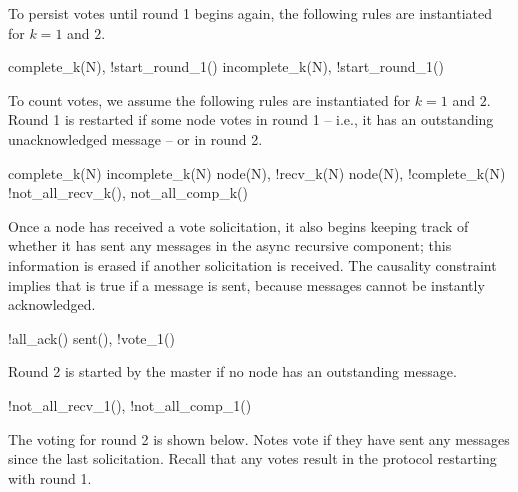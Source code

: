 To persist votes until round 1 begins again, the following rules are instantiated for $k=1$ and $2$.

\begin{Drules}
      {complete_k(N), !start_round_1()}
      {incomplete_k(N), !start_round_1()}
\end{Drules}

To count votes, we assume the following rules are instantiated for $k=1$ and $2$.  Round 1 is restarted if some node votes  in round 1 -- i.e., it has an outstanding unacknowledged message -- or  in round 2.

\begin{Drules}
      {complete_k(N)}
      {incomplete_k(N)}
      {node(N), !recv_k(N)}
      {node(N), !complete_k(N)}
      {!not_all_recv_k(), not_all_comp_k()}
\end{Drules}

Once a node has received a  vote solicitation, it also begins keeping track of whether it has sent any messages in the async recursive component; this information is erased if another  solicitation is received.  The causality constraint implies that  is true if a message is sent, because messages cannot be instantly acknowledged.

\begin{Drules}
      {!all_ack()}
      {sent(), !vote_1()}
\end{Drules}

Round 2 is started by the master if no node has an outstanding message.

\begin{Drules}
      {!not_all_recv_1(), !not_all_comp_1()}
\end{Drules}

The voting for round 2 is shown below.  Notes vote  if they have sent any messages since the last  solicitation.  Recall that any  votes result in the protocol restarting with round 1.

